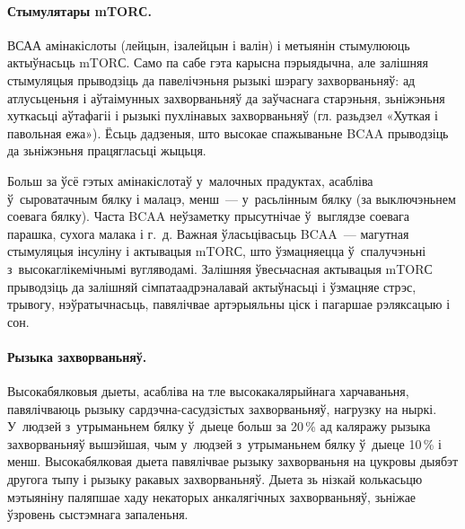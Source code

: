 
\paragraph{Стымулятары mTORС.}
ВСАА амінакіслоты (лейцын, ізалейцын і валін) і метыянін стымулююць актыўнасьць mTORС. Само па сабе гэта карысна пэрыядычна, але залішняя стымуляцыя прыводзіць да павелічэньня рызыкі шэрагу захворваньняў: ад атлусьценьня і аўтаімунных захворваньняў да заўчаснага старэньня, зьніжэньня хуткасьці аўтафагіі і рызыкі пухлінавых захворваньняў (гл. разьдзел «Хуткая і павольная ежа»). Ёсьць дадзеныя, што высокае спажываньне BCAA прыводзіць да зьніжэньня працягласьці жыцьця.

Больш за ўсё гэтых амінакіслотаў у~малочных прадуктах, асабліва ў~сыроватачным бялку і малацэ, менш~--- у~расьлінным бялку (за выключэньнем соевага бялку). Часта BCAA неўзаметку прысутнічае ў~выглядзе соевага парашка, сухога малака і г.~д. Важная ўласьцівасьць BCAA~--- магутная стымуляцыя інсуліну і актывацыя mTORС, што ўзмацняецца ў~спалучэньні з~высокаглікемічнымі вугляводамі. Залішняя ўвесьчасная актывацыя mTORС прыводзіць да залішняй сімпатаадрэналавай актыўнасьці і ўзмацняе стрэс, трывогу, нэўратычнасьць, павялічвае артэрыяльны ціск і пагаршае рэляксацыю і сон.

\paragraph{Рызыка захворваньняў.}
Высокабялковыя дыеты, асабліва на тле высокакалярыйнага харчаваньня, павялічваюць рызыку сардэчна-сасудзістых захворваньняў, нагрузку на ныркі. У~людзей з~утрыманьнем бялку ў~дыеце больш за 20\,\% ад каляражу рызыка захворваньняў вышэйшая, чым у~людзей з~утрыманьнем бялку ў~дыеце 10\,\% і менш. Высокабялковая дыета павялічвае рызыку захворваньня на цукровы дыябэт другога тыпу і рызыку ракавых захворваньняў. Дыета зь нізкай колькасьцю мэтыяніну паляпшае хаду некаторых анкалягічных захворваньняў, зьніжае ўзровень сыстэмнага запаленьня.

